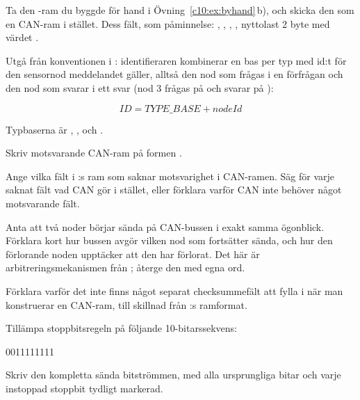 
\label{c10:ex:ascan}
Ta den -ram du byggde för hand i Övning~\ref{c10:ex:byhand}\,b), och skicka den som
en CAN-ram i stället. Dess fält, som påminnelse: , ,
, , nyttolast 2 byte med värdet .

Utgå från konventionen i : identifieraren kombinerar en bas per typ med
id:t för den sensornod meddelandet gäller, alltså den nod som frågas i en förfrågan och den nod som
svarar i ett svar (nod 3 frågas på  och svarar på ):

\[ \mathit{ID} = \mathit{TYPE\_BASE} + \mathit{nodeId} \]

Typbaserna är , ,  och
.

 Skriv motsvarande CAN-ram på formen .

 Ange vilka fält i :s ram som saknar motsvarighet i CAN-ramen. Säg
för varje saknat fält vad CAN gör i stället, eller förklara varför CAN inte behöver något
motsvarande fält.

 Anta att två noder börjar sända på CAN-bussen i exakt samma ögonblick. Förklara kort hur
bussen avgör vilken nod som fortsätter sända, och hur den förlorande noden upptäcker att den har
förlorat. Det här är arbitreringsmekanismen från ; återge den med egna
ord.

 Förklara varför det inte finns något separat checksummefält att fylla i när man
konstruerar en CAN-ram, till skillnad från :s ramformat.


\label{c10:ex:stuffing}
 Tillämpa stoppbitsregeln på följande 10-bitarssekvens:

\begin{textdrawing}
0011111111
\end{textdrawing}

Skriv den kompletta sända bitströmmen, med alla ursprungliga bitar och varje instoppad stoppbit
tydligt markerad.

